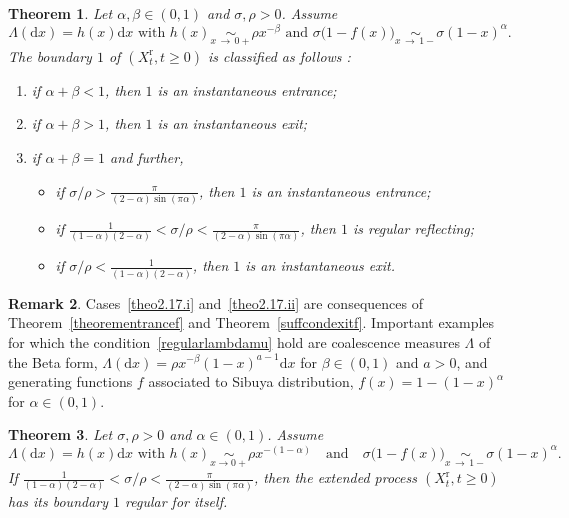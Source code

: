 \documentclass[10pt]{amsart}
\newtheorem{theo}{Theorem}[section]
\theoremstyle{definition}\newtheorem{defi}[theo]{Definition}\newtheorem{rema}[theo]{Remark}\newtheorem{exam}[theo]{Example}\newtheorem{exem}[theo]{Example}\newtheorem{nota}[theo]{Notation}
\newcommand{\ddr}{\mathrm{d}}
\newcommand{\rmr}{\mathrm{r}}
\newcommand*{\romanenumi}{\renewcommand*{\theenumi}{\roman{enumi}}}
\begin{document}
\begin{theo}\label{regularcase}
Let $\alpha,\beta\in (0,1)$ and $\sigma,\rho>0$. Assume
\begin{equation}\label{regularlambdamu}
\Lambda(\ddr x)=h(x)\ddr x \text{ with } h(x)\underset{x\,\rightarrow\,0+}{\sim}\rho x^{-\beta} \text{ and } \sigma \big(1-f(x)\big)\underset{x\,\rightarrow\,1-}{\sim} \sigma (1-x)^{\alpha}.
\end{equation}
The boundary $1$ of $(X_t^{\rmr},t\geq 0)$ is classified as follows :
\begin{enumerate}\romanenumi
\item \label{theo2.17.i}if $\alpha+\beta<1$, then $1$ is an instantaneous entrance;
\vspace*{1mm}
\item\label{theo2.17.ii} if $\alpha+\beta>1$, then $1$ is an instantaneous exit;
\vspace*{1mm}
\item\label{theo2.17.iii} if $\alpha+\beta=1$ and further,
\vspace*{2mm}
\begin{itemize}
\item if $\sigma/\rho>\frac{\pi}{(2-\alpha)\sin(\pi \alpha)}$, then $1$ is an instantaneous entrance;
\vspace*{2mm}
\item if $\frac{1}{(1-\alpha)(2-\alpha)}<\sigma/\rho<\frac{\pi}{(2-\alpha)\sin(\pi \alpha)}$, then $1$ is regular reflecting;
\vspace*{2mm}
\item if $\sigma/\rho<\frac{1}{(1-\alpha)(2-\alpha)}$, then $1$ is an instantaneous exit.
\end{itemize}
\end{enumerate}
\end{theo}

\begin{rema}
Cases~\eqref{theo2.17.i} and~\eqref{theo2.17.ii} are consequences of Theorem~\ref{theorementrancef} and Theorem~\ref{suffcondexitf}. Important examples for which the condition~\eqref{regularlambdamu} hold are coalescence measures $\Lambda$ of the Beta form, $\Lambda(\ddr x)=\rho x^{-\beta}(1-x)^{a-1} \ddr x$ for $\beta\in (0,1)$ and $a>0$, and generating functions $f$ associated to Sibuya distribution, $f(x)=1-(1-x)^{\alpha}$ for $\alpha\in (0,1)$.
\end{rema}


\begin{theo}\label{regularforitselfstable}
Let $\sigma,\rho>0$ and $\alpha \in (0,1)$.
Assume 
\[
\Lambda(\ddr x)=h(x)\ddr x \text{ with } h(x)\underset{x\rightarrow 0+}{\sim}\rho x^{-(1-\alpha)}
\quad
\text{and} 
\quad
\sigma\big(1-f(x)\big)\underset{x\,\rightarrow\,1-}{\sim} \sigma (1-x)^{\alpha}.
\]
If $\frac{1}{(1-\alpha)(2-\alpha)}<\sigma/\rho<\frac{\pi}{(2-\alpha)\sin(\pi \alpha)}$, then the extended process $(X_t^{\rmr},t\geq 0)$ has its boundary $1$ regular for itself.
\end{theo}
\end{document}
